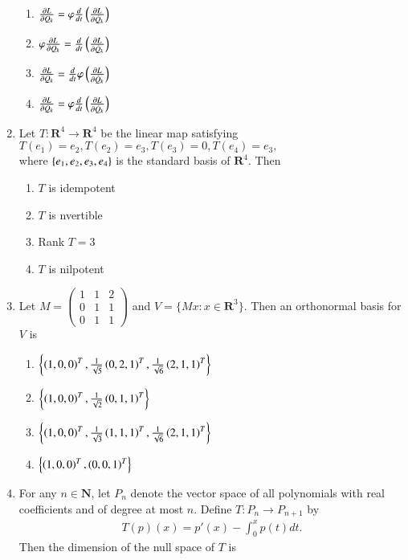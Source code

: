 \documentclass[journal]{IEEEtran}
\numberwithin{equation}{enumi}
\numberwithin{figure}{enumi}
\begin{document}
\begin{enumerate}[start=18]
\begin{enumerate}
        \item $\frac{\partial L}{\partial Q_k} = \varphi \frac{d}{dt} \left(\frac{\partial L}{\partial \dot{Q}_k}\right)$
        \item $\varphi \frac{\partial L}{\partial Q_k} = \frac{d}{dt} \left(\frac{\partial L}{\partial \dot{Q}_k}\right)$
        \item $\frac{\partial L}{\partial Q_k} = \frac{d}{dt} \varphi \left(\frac{\partial L}{\partial \dot{Q}_k}\right)$
        \item $\frac{\partial L}{\partial Q_k} = \varphi \frac{d}{dt} \left(\frac{\partial L}{\partial \dot{Q}_k}\right)$
    \end{enumerate}
\item Let $T : \mathbf{R}^4 \to \mathbf{R}^4$ be the linear map satisfying
\\$
T(e_1) = e_2, T(e_2) = e_3, T(e_3) = 0, T(e_4) = e_3,
$\\
where $\left\{e_1, e_2, e_3, e_4\right\}$ is the standard basis of $\mathbf{R}^4$. Then
    \begin{enumerate}
        \item $T$ is idempotent
        \item $T$ is nvertible
        \item Rank $T = 3$
        \item $T$ is nilpotent
    \end{enumerate}
\item Let $M = \begin{pmatrix}
1 & 1 & 2 \\
0 & 1 & 1 \\
0 & 1 & 1
\end{pmatrix}$ and $V = \{ Mx : x \in \mathbf{R}^3 \}$. Then an orthonormal basis for $V$ is
\begin{enumerate}
    \item $\left\{\left(1, 0, 0\right)^T, \frac{1}{\sqrt{5}}\left(0, 2, 1\right)^T, \frac{1}{\sqrt{6}}\left(2, 1, 1\right)^T\right\}$
    \item $\left\{\left(1, 0, 0\right)^T, \frac{1}{\sqrt{2}}\left(0, 1, 1\right)^T\right\}$
    \item $\left\{\left(1, 0, 0\right)^T, \frac{1}{\sqrt{3}}\left(1, 1, 1\right)^T, \frac{1}{\sqrt{6}}\left(2, 1, 1\right)^T\right\}$
    \item $\left\{\left(1, 0, 0\right)^T, \left(0, 0, 1\right)^T\right\}$
\end{enumerate}
\item For any $n \in \mathbf{N}$, let $P_n$ denote the vector space of all polynomials with real coefficients and of degree at most $n$. Define $T: P_n \rightarrow P_{n+1}$ by
\begin{align*}
T(p)(x) = p'(x) - \int_0^x p(t) dt.
\end{align*}
Then the dimension of the null space of $T$ is


\end{enumerate}
\end{document}
